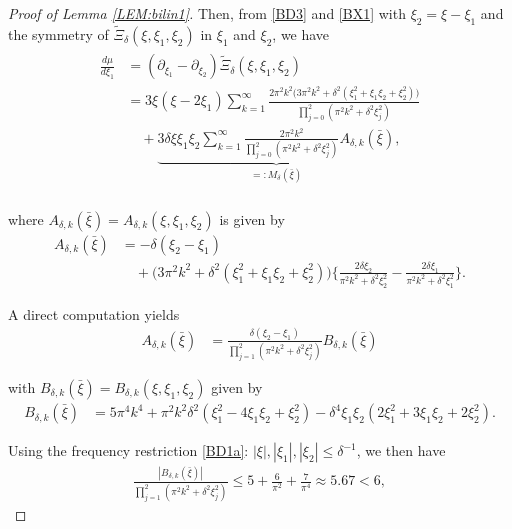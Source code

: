 \documentclass[letterpaper, 11pt,  reqno]{amsart}
\newcommand{\1}{\hspace{0.5mm}\textup{I}\hspace{0.5mm}}
\newcommand{\II}{\textup{I \hspace{-2.8mm} I} }
\newcommand{\noi}{\noindent}
\newcommand{\dl}{\delta}
\newcommand{\wt}{\widetilde}
\newcommand{\dd}{\partial}
\numberwithin{equation}{section}
\numberwithin{theorem}{section}
\begin{document}
\begin{proof}[Proof of Lemma \ref{LEM:bilin1}]
\noi
Then, from \eqref{BD3} and \eqref{BX1}
with $\xi_2 = \xi - \xi_1$
and the symmetry 
of $ \wt \Xi_\dl(\xi, \xi_1,  \xi_2)$ in $\xi_1$ and $\xi_2$, 
 we have 
\begin{align}
\begin{split}
 \frac{d \mu}{d \xi_1}
& = (\dd_{\xi_1} - \dd_{\xi_2})
\wt \Xi_\dl(\xi, \xi_1,  \xi_2) \\
& = 3\xi  (\xi -2 \xi_1)
 \sum_{k=1}^{\infty}   
 \frac{2 \pi^2 k^2 \big(3 \pi^2 k^2 + \dl^2(\xi_1^2 + \xi_1 \xi_2 + \xi_2^2)\big)}
 {\prod_{j = 0}^2(\pi^2 k^2 +\dl^2\xi_j^2)}\\
& \quad +  \underbrace{3\dl \xi \xi_1 \xi_2
 \sum_{k=1}^{\infty}   
 \frac{2 \pi^2 k^2 }
 {\prod_{j = 0}^2(\pi^2 k^2 +\dl^2\xi_j^2)}A_{\dl, k}(\bar \xi)}_{=:M_{\dl}(\bar \xi) },  \\
\end{split}
\label{BX2}
\end{align}


\noi
where $A_{\dl, k}(\bar \xi) = A_{\dl, k}(\xi, \xi_1, \xi_2)$ is given by 
\begin{align*}
A_{\dl, k}(\bar \xi)
& = -\dl(\xi_2 - \xi_1) \\
& \quad + \big(3 \pi^2 k^2 + \dl^2(\xi_1^2 + \xi_1 \xi_2 + \xi_2^2)\big)
\bigg\{
\frac{  2\dl \xi_2  }
 {\pi^2 k^2 +\dl^2\xi_2^2}
- \frac{  2\dl \xi_1  }
 {\pi^2 k^2 +\dl^2\xi_1^2}\bigg\}.
\end{align*}

\noi
A direct computation yields
\begin{align}
A_{\dl, k}(\bar \xi)
& = \frac{\dl(\xi_2 - \xi_1) }
 {\prod_{j = 1}^2 (\pi^2 k^2 +\dl^2\xi_j^2)}
 B_{\dl, k}(\bar \xi) 
\label{BX4}
\end{align}

\noi
with  $B_{\dl, k}(\bar \xi) = B_{\dl, k}(\xi, \xi_1, \xi_2)$  given by 
\begin{align*}
 B_{\dl, k}(\bar \xi)
&  = 
5\pi^4 k^4 + \pi^2 k^2 \dl^2 (\xi_1^2 - 4\xi_1\xi_2 + \xi_2^2)
 - \dl^4 \xi_1\xi_2(2\xi_1^2 + 3\xi_1\xi_2+ 2\xi_2^2).
\end{align*}

\noi
Using the frequency restriction \eqref{BD1a}:
$ |\xi|, 
 |\xi_1|, |\xi_2|\le   \dl^{-1}$, 
 we then have
\begin{align}
\frac{ |B_{\dl, k}(\bar \xi)| }
 {\prod_{j = 1}^2 (\pi^2 k^2 +\dl^2\xi_j^2)}
\le 5 + \frac 6{\pi^2} + \frac 7{\pi^4} 
\approx 5.67 < 6, 
\label{BX5}
\end{align}


\end{proof}
\end{document}
